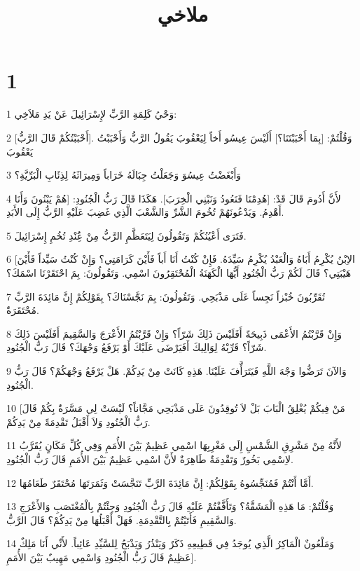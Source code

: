 

\title{ملاخي}


\chapter{1}

\par 1 وَحْيُ كَلِمَةِ الرَّبِّ لإِسْرَائِيلَ عَنْ يَدِ مَلاَخِي:
\par 2 [أَحْبَبْتُكُمْ قَالَ الرَّبُّ]. وَقُلْتُمْ: [بِمَا أَحْبَبْتَنَا؟] أَلَيْسَ عِيسُو أَخاً لِيَعْقُوبَ يَقُولُ الرَّبُّ وَأَحْبَبْتُ يَعْقُوبَ
\par 3 وَأَبْغَضْتُ عِيسُوَ وَجَعَلْتُ جِبَالَهُ خَرَاباً وَمِيرَاثَهُ لِذِئَابِ الْبَرِّيَّةِ؟
\par 4 لأَنَّ أَدُومَ قَالَ قَدْ: [هُدِمْنَا فَنَعُودُ وَنَبْنِي الْخِرَبَ]. هَكَذَا قَالَ رَبُّ الْجُنُودِ: [هُمْ يَبْنُونَ وَأَنَا أَهْدِمُ. وَيَدْعُونَهُمْ تُخُومَ الشَّرِّ وَالشَّعْبَ الَّذِي غَضِبَ عَلَيْهِ الرَّبُّ إِلَى الأَبَدِ.
\par 5 فَتَرَى أَعْيُنُكُمْ وَتَقُولُونَ لِيَتَعَظَّمِ الرَّبُّ مِنْ عَُِنْدِ تُخُمِ إِسْرَائِيلَ.
\par 6 [الاِبْنُ يُكْرِمُ أَبَاهُ وَالْعَبْدُ يُكْرِمُ سَيِّدَهُ. فَإِنْ كُنْتُ أَنَا أَباً فَأَيْنَ كَرَامَتِي؟ وَإِنْ كُنْتُ سَيِّداً فَأَيْنَ هَيْبَتِي؟ قَالَ لَكُمْ رَبُّ الْجُنُودِ أَيُّهَا الْكَهَنَةُ الْمُحْتَقِرُونَ اسْمِي. وَتَقُولُونَ: بِمَ احْتَقَرْنَا اسْمَكَ؟
\par 7 تُقَرِّبُونَ خُبْزاً نَجِساً عَلَى مَذْبَحِي. وَتَقُولُونَ: بِمَ نَجَّسْنَاكَ؟ بِقَوْلِكُمْ إِنَّ مَائِدَةَ الرَّبِّ مُحْتَقَرَةٌ.
\par 8 وَإِنْ قَرَّبْتُمُ الأَعْمَى ذَبِيحَةً أَفَلَيْسَ ذَلِكَ شَرّاً؟ وَإِنْ قَرَّبْتُمُ الأَعْرَجَ وَالسَّقِيمَ أَفَلَيْسَ ذَلِكَ شَرّاً؟ قَرِّبْهُ لِوَالِيكَ أَفَيَرْضَى عَلَيْكَ أَوْ يَرْفَعُ وَجْهَكَ؟ قَالَ رَبُّ الْجُنُودِ.
\par 9 وَالآنَ تَرَضُّوا وَجْهَ اللَّهِ فَيَتَرَأَّفَ عَلَيْنَا. هَذِهِ كَانَتْ مِنْ يَدِكُمْ. هَلْ يَرْفَعُ وَجْهَكُمْ؟ قَالَ رَبُّ الْجُنُودِ.
\par 10 [مَنْ فِيكُمْ يُغْلِقُ الْبَابَ بَلْ لاَ تُوقِدُونَ عَلَى مَذْبَحِي مَجَّاناً؟ لَيْسَتْ لِي مَسَّرَةٌ بِكُمْ قَالَ رَبُّ الْجُنُودِ وَلاَ أَقْبَلُ تَقْدِمَةً مِنْ يَدِكُمْ.
\par 11 لأَنَّهُ مِنْ مَشْرِقِ الشَّمْسِ إِلَى مَغْرِبِهَا اسْمِي عَظِيمٌ بَيْنَ الأُمَمِ وَفِي كُلِّ مَكَانٍ يُقَرَّبُ لاِسْمِي بَخُورٌ وَتَقْدِمَةٌ طَاهِرَةٌ لأَنَّ اسْمِي عَظِيمٌ بَيْنَ الأُمَمِ قَالَ رَبُّ الْجُنُودِ.
\par 12 أَمَّا أَنْتُمْ فَمُنَجِّسُوهُ بِقَوْلِكُمْ: إِنَّ مَائِدَةَ الرَّبِّ تَنَجَّسَتْ وَثَمَرَتَهَا مُحْتَقَرٌ طَعَامُهَا.
\par 13 وَقُلْتُمْ: مَا هَذِهِ الْمَشَقَّةُ؟ وَتَأَفَّفْتُمْ عَلَيْهِ قَالَ رَبُّ الْجُنُودِ وَجِئْتُمْ بِالْمُغْتَصَبِ وَالأَعْرَجِ وَالسَّقِيمِ فَأَتَيْتُمْ بِالتَّقْدِمَةِ. فَهَلْ أَقْبَلُهَا مِنْ يَدِكُمْ؟ قَالَ الرَّبُّ.
\par 14 وَمَلْعُونٌ الْمَاكِرُ الَّذِي يُوجَدُ فِي قَطِيعِهِ ذَكَرٌ وَيَنْذُرُ وَيَذْبَحُ لِلسَّيِّدِ عَائِباً. لأَنِّي أَنَا مَلِكٌ عَظِيمٌ قَالَ رَبُّ الْجُنُودِ وَاسْمِي مَهِيبٌ بَيْنَ الأُمَمِ].

